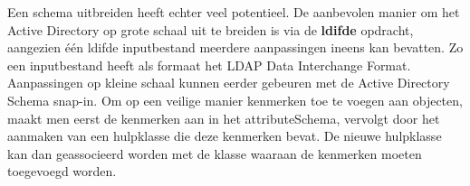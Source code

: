 \begin{enumerate}
{\begin{itemize}
				Een schema uitbreiden heeft echter veel potentieel. De aanbevolen manier om het Active Directory op grote schaal uit te breiden is via de \textbf{ldifde} opdracht, aangezien één ldifde inputbestand meerdere aanpassingen ineens kan bevatten. Zo een inputbestand heeft als formaat het LDAP Data Interchange Format. Aanpassingen op kleine schaal kunnen eerder gebeuren met de Active Directory Schema snap-in. Om op een veilige manier kenmerken toe te voegen aan objecten, maakt men eerst de kenmerken aan in het attributeSchema, vervolgt door het aanmaken van een hulpklasse die deze kenmerken bevat. De nieuwe hulpklasse kan dan geassocieerd worden met de klasse waaraan de kenmerken moeten toegevoegd worden.
			\end{itemize}
		}
	\end{enumerate}
	
